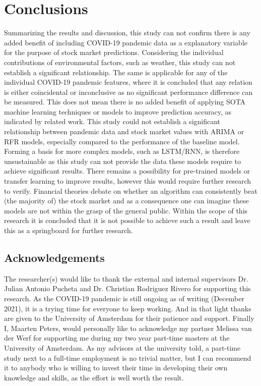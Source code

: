 \section{Conclusions}
\label{sec:conc}
Summarizing the results and discussion, this study can not confirm there is any added benefit of including COVID-19 pandemic data as a explanatory variable for the purpose of stock market predictions. Considering the individual contributions of environmental factors, such as weather, this study can not establish a significant relationship. The same is applicable for any of the individual COVID-19 pandemic features, where it is concluded that any relation is either coincidental or inconclusive as no significant performance difference can be measured.
This does not mean there is no added benefit of applying SOTA machine learning techniques or models to improve prediction accuracy, as indicated by related work. This study could not establish a significant relationship between pandemic data and stock market values with ARIMA or RFR models, especially compared to the performance of the baseline model. Forming a basis for more complex models, such as LSTM/RNN, is therefore unsustainable as this study can not provide the data these models require to achieve significant results. There remains a possibility for pre-trained models or transfer learning to improve results, however this would require further research to verify. Financial theories debate on whether an algorithm can consistently beat (the majority of) the stock market and as a consequence one can imagine these models are not within the grasp of the general public. Within the scope of this research it is concluded that it is not possible to achieve such a result and leave this as a springboard for further research.

\subsection{Acknowledgements}
The researcher(s) would like to thank the external and internal supervisors Dr. Julian Antonio Pucheta and Dr. Christian Rodriguez Rivero for supporting this research. As the COVID-19 pandemic is still ongoing as of writing (December 2021), it is a trying time for everyone to keep working. And in that light thanks are given to the University of Amsterdam for their patience and support. 
Finally I, Maarten Peters, would personally like to acknowledge my partner Melissa van der Werf for supporting me during my two year part-time masters at the University of Amsterdam. As my advisors at the university told, a part-time study next to a full-time employment is no trivial matter, but I can recommend it to anybody who is willing to invest their time in developing their own knowledge and skills, as the effort is well worth the result.